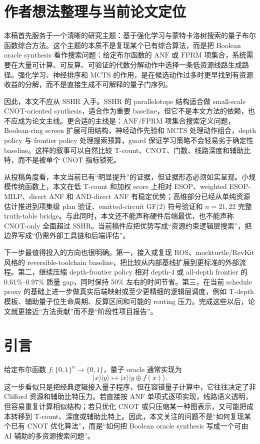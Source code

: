 \documentclass[UTF8,fontset=macnew,11pt]{ctexart}
\newcommand{\anf}{\ensuremath{\mathrm{ANF}}}
\newcommand{\fprm}{\ensuremath{\mathrm{FPRM}}}
\newcommand{\mcts}{\ensuremath{\mathrm{MCTS}}}
\newcommand{\xor}{\ensuremath{\oplus}}
\newcommand{\ttable}{truth-table}
\begin{document}
\section*{作者想法整理与当前论文定位}

本稿首先服务于一个清晰的研究主题：基于强化学习与蒙特卡洛树搜索的量子布尔函数综合方法。这个主题的本质不是复现某个已有综合算法，而是把 Boolean oracle synthesis 看作搜索问题：给定布尔函数的 \anf{} 或 \fprm{} 项集合，系统需要在大量可计算、可反算、可验证的代数分解动作中选择一条低资源线路生成路径。强化学习、神经排序和 \mcts{} 的作用，是在候选动作过多时更早找到有资源收益的分解，而不是直接生成不可解释的量子门序列。

因此，本文不应从 SSHR 入手。SSHR 的 parallelotope 结构适合做 small-scale CNOT-oriented synthesis，适合作为重要 baseline，但它不是本文方法的依赖，也不应成为论文主线。更合适的主线是：\anf{}/\fprm{} 项集合搜索定义问题，Boolean-ring screen 扩展可用结构，神经动作先验和 \mcts{} 处理动作组合，depth policy 与 frontier policy 处理搜索预算，guard 保证学习策略不会轻易劣于确定性 baseline。这样的叙事可以自然比较 T-count、CNOT、门数、线路深度和辅助比特，而不是被单个 CNOT 指标锁死。

从投稿角度看，本文当前已有“明显提升”的证据，但证据形态必须如实呈现。小规模传统函数上，本文在低 T-count 和加权 score 上相对 ESOP、weighted ESOP-MILP、direct ANF 和 AND-direct ANF 有稳定优势；高维部分已经从单纯资源估计推进到项集级 plan 验证、emitted-circuit GF(2) 符号验证和 $n=21,22$ 完整 \ttable{} bridge。与此同时，本文还不能声称硬件后端最优，也不能声称 CNOT-only 全面超过 SSHR。当前稿件应把优势写成“资源约束逻辑层搜索”，把边界写成“仍需外部工具链和后端评估”。

下一步最值得投入的方向也很明确。第一，接入或复现 ROS、mockturtle/RevKit 风格的 reversible-toolchain baseline，把比较从内部基线扩展到更标准的外部流程。第二，继续压缩 depth-frontier policy 相对 depth-4 或 all-depth frontier 的 0.61\%--0.97\% 质量 gap，同时保持 50\% 左右的时间节省。第三，在当前 schedule proxy 的基础上进一步做真实后端映射或至少更精细的逻辑层调度，例如 T-depth 模板、辅助量子位生命周期、反算区间和可能的 routing 压力。完成这些以后，论文就更接近“方法贡献”而不是“阶段性项目报告”。

\section{引言}

给定布尔函数 $f:\{0,1\}^n\rightarrow\{0,1\}$，量子 oracle 通常实现为
\begin{equation}
  |x\rangle |y\rangle \mapsto |x\rangle |y\xor f(x)\rangle .
  \label{eq:oracle}
\end{equation}
这一步看似只是把经典逻辑接入量子程序，但在容错量子计算中，它往往决定了非 Clifford 资源和辅助比特压力。若直接按 \anf{} 单项式逐项实现，线路语义透明，但容易重复计算相似结构；若只优化 CNOT 或只压缩某一种图表示，又可能把成本转移到 T-count、深度或辅助比特上。因此，本文关注的问题不是“如何复现某个已有 CNOT 优化算法”，而是“如何把 Boolean oracle synthesis 写成一个可由 AI 辅助的多资源搜索问题”。
\end{document}
